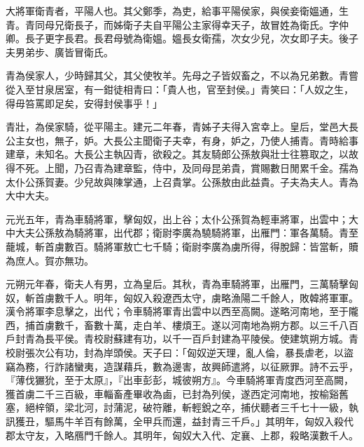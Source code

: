 
\begin{pinyinscope}
大將軍衛青者，平陽人也。其父鄭季，為吏，給事平陽侯家，與侯妾衛媼通，生青。青同母兄衛長子，而姊衛子夫自平陽公主家得幸天子，故冒姓為衛氏。字仲卿。長子更字長君。長君母號為衛媼。媼長女衛孺，次女少兒，次女即子夫。後子夫男弟步、廣皆冒衛氏。

青為侯家人，少時歸其父，其父使牧羊。先母之子皆奴畜之，不以為兄弟數。青嘗從入至甘泉居室，有一鉗徒相青曰：「貴人也，官至封侯。」青笑曰：「人奴之生，得毋笞罵即足矣，安得封侯事乎！」

青壯，為侯家騎，從平陽主。建元二年春，青姊子夫得入宮幸上。皇后，堂邑大長公主女也，無子，妒。大長公主聞衛子夫幸，有身，妒之，乃使人捕青。青時給事建章，未知名。大長公主執囚青，欲殺之。其友騎郎公孫敖與壯士往篡取之，以故得不死。上聞，乃召青為建章監，侍中，及同母昆弟貴，賞賜數日閒累千金。孺為太仆公孫賀妻。少兒故與陳掌通，上召貴掌。公孫敖由此益貴。子夫為夫人。青為大中大夫。

元光五年，青為車騎將軍，擊匈奴，出上谷；太仆公孫賀為輕車將軍，出雲中；大中大夫公孫敖為騎將軍，出代郡；衛尉李廣為驍騎將軍，出雁門：軍各萬騎。青至蘢城，斬首虜數百。騎將軍敖亡七千騎；衛尉李廣為虜所得，得脫歸：皆當斬，贖為庶人。賀亦無功。

元朔元年春，衛夫人有男，立為皇后。其秋，青為車騎將軍，出雁門，三萬騎擊匈奴，斬首虜數千人。明年，匈奴入殺遼西太守，虜略漁陽二千餘人，敗韓將軍軍。漢令將軍李息擊之，出代；令車騎將軍青出雲中以西至高闕。遂略河南地，至于隴西，捕首虜數千，畜數十萬，走白羊、樓煩王。遂以河南地為朔方郡。以三千八百戶封青為長平侯。青校尉蘇建有功，以千一百戶封建為平陵侯。使建筑朔方城。青校尉張次公有功，封為岸頭侯。天子曰：「匈奴逆天理，亂人倫，暴長虐老，以盜竊為務，行詐諸蠻夷，造謀藉兵，數為邊害，故興師遣將，以征厥罪。詩不云乎，『薄伐玁狁，至于太原』，『出車彭彭，城彼朔方』。今車騎將軍青度西河至高闕，獲首虜二千三百級，車輜畜產畢收為鹵，已封為列侯，遂西定河南地，按榆谿舊塞，絕梓領，梁北河，討蒲泥，破符離，斬輕銳之卒，捕伏聽者三千七十一級，執訊獲丑，驅馬牛羊百有餘萬，全甲兵而還，益封青三千戶。」其明年，匈奴入殺代郡太守友，入略鴈門千餘人。其明年，匈奴大入代、定襄、上郡，殺略漢數千人。


\end{pinyinscope}
